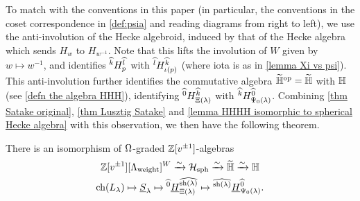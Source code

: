 To match with the conventions in this paper (in particular, the conventions in the coset correspondence in \cref{def:psia} and reading diagrams from right to left), we use the anti-involution of the Hecke algebroid, induced by that of the Hecke algebra which sends $H_w$ to $H_{w^{-1}}$.
Note that this lifts the involution of $W$ given by $w \mapsto w^{-1}$,  and identifies ${}^{\widehat{k}}H^{\widehat{l}}_{p}$ with ${}^{\widehat{l}}H^{\widehat{k}}_{\iota(p)}$ (where iota is as in \cref{lemma Xi vs psi}).
This anti-involution further identifies the commutative algebra $\widetilde{\mathbb{H}}^{\operatorname{op}}=\widetilde{\mathbb{H}}$ with $\mathbb{H}$ (see \cref{defn the algebra HHH}), identifying ${}^{\widehat{0}}H^{\widehat{k}}_{\Xi(\lambda)}$ with ${}^{\widehat{k}}H^{\widehat{0}}_{\Psi_0(\lambda)}$.
Combining \cref{thm Satake original}, \cref{thm Lusztig Satake} and \cref{lemma HHHH isomorphic to spherical Hecke algebra} with this observation, we then have the following theorem.
\begin{theorem}\label{thm Satake isomorphism to HHH}
 There is an isomorphism of $\Omega$-graded $\mathbb{Z}[v^{\pm 1}]$-algebras
 \begin{gather}
     \notag \mathbb{Z}[v^{\pm 1}][\Lambda_{\operatorname{weight}}]^W \xrightarrow{\sim} \mathcal{H}_{\operatorname{sph}} \xrightarrow{\sim} \widetilde{\mathbb{H}} \xrightarrow{\sim}\mathbb{H} \\
     \notag  \operatorname{ch}(L_\lambda) \mapsto \underline{S}_\lambda \mapsto {}^{\widehat{0}}\underline{H}^{\widehat{\operatorname{sh}(\lambda)}}_{\Xi(\lambda)} \mapsto {}^{\widehat{\operatorname{sh}(\lambda)}}\underline{H}^{\widehat{0}}_{\Psi_0(\lambda)}. 
 \end{gather}   
\end{theorem}



